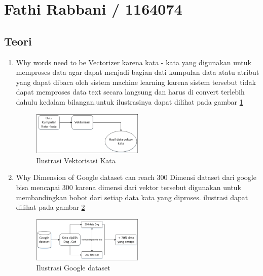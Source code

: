 \section{Fathi Rabbani / 1164074}
\subsection{Teori}
\begin{enumerate}
\item Why words need to be Vectorizer
\subitem karena kata - kata yang digunakan untuk memproses data agar dapat menjadi bagian dati kumpulan data atatu atribut yang dapat dibaca oleh sistem machine learning karena sistem tersebut tidak dapat memproses data text secara langsung dan harus di convert terlebih dahulu kedalam bilangan.untuk ilustrasinya dapat dilihat pada gambar \ref{fig1}
\begin{figure}[!htbp]
	\centering
	\includegraphics[width=0.5\textwidth]{figures/fathi/chapter5/hari1/1}
	\caption{Ilustrasi Vektorisasi Kata}
	\label{fig1}
\end{figure}

\item Why Dimension of Google dataset can reach 300
\subitem Dimensi dataset dari google bisa mencapai 300 karena dimensi dari vektor tersebut digunakan untuk membandingkan bobot dari setiap data kata yang diproses. ilustrasi dapat dilihat pada gambar \ref{fig2}
\begin{figure}[!htbp]
	\centering
	\includegraphics[width=0.5\textwidth]{figures/fathi/chapter5/hari1/2}
	\caption{Ilustrasi Google dataset}
	\label{fig2}
\end{figure}


\end{enumerate}
